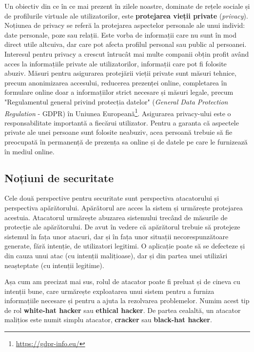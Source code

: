 Un obiectiv din ce în ce mai prezent în zilele noastre, dominate de rețele sociale și de profilurile virtuale ale utilizatorilor, este \textbf{protejarea vieții private} (\textit{privacy}). Noțiunea de privacy se referă la protejarea aspectelor personale ale unui individ: date personale, poze sau relații. Este vorba de informații care nu sunt în mod direct utile altcuiva, dar care pot afecta profilul personal sau public al persoanei. Interesul pentru privacy a crescut întrucât mai multe companii obțin profit având acces la informațiile private ale utilizatorilor, informații care pot fi folosite abuziv. Măsuri pentru asigurarea protejării vieții private sunt măsuri tehnice, precum anonimizarea accesului, reducerea prezenței online, completarea în formulare online doar a informațiilor strict necesare și măsuri legale, precum "Regulamentul general privind protecția datelor" (\textit{General Data Protection Regulation} - GDPR) în Uniunea Europeană\footnote{\url{https://gdpr-info.eu/}}. Asigurarea privacy-ului este o responsabilitate importantă a fiecărui utilizator. Pentru a garanta că aspectele private ale unei persoane sunt folosite neabuziv, acea persoană trebuie să fie preocupată în permanență de prezența sa online și de datele pe care le furnizează în mediul online.

\subsection{Noțiuni de securitate}
\label{sec:sec:fundamentals:notions}

Cele două perspective pentru securitate sunt perspectiva atacatorului și perspectiva apărătorului. Apărătorul are acces la sistem și urmărește protejarea acestuia. Atacatorul urmărește abuzarea sistemului trecând de măsurile de protecție ale apărătorului. De avut în vedere că apărătorul trebuie să protejeze sistemul în fața unor atacuri, dar și în fața unor situații necorespunzătoare generate, fără intenție, de utilizatori legitimi. O aplicație poate să se defecteze și din cauza unui atac (cu intenții malițioase), dar și din partea unei utilizări neașteptate (cu intenții legitime).

Așa cum am precizat mai sus, rolul de atacator poate fi preluat și de cineva cu intenții bune, care urmărește exploatarea unui sistem pentru a furniza informațiile necesare și pentru a ajuta la rezolvarea problemelor. Numim acest tip de rol \textbf{white-hat hacker} sau \textbf{ethical hacker}. De partea cealaltă, un atacator malițios este numit simplu atacator, \textbf{cracker} sau \textbf{black-hat hacker}.

